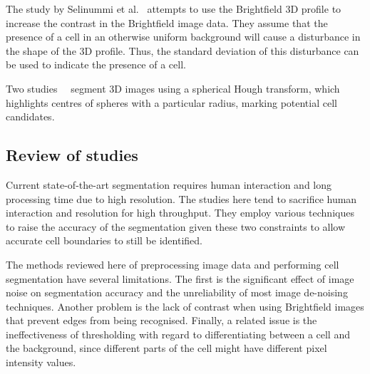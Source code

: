 The study by Selinummi et al.~\cite{selinummi} attempts to use the Brightfield 3D profile to increase the contrast in the Brightfield image data. They assume that the presence of a cell in an otherwise uniform background will cause a disturbance in the shape of the 3D profile. Thus, the standard deviation of this disturbance can be used to indicate the presence of a cell.

Two studies~\cite{liu}~\cite{zanella} segment 3D images using a spherical Hough transform, which highlights centres of spheres with a particular radius, marking potential cell candidates.

\subsection{Review of studies}

Current state-of-the-art segmentation requires human interaction and long processing time due to high resolution. The studies here tend to sacrifice human interaction and resolution for high throughput. They employ various techniques to raise the accuracy of the segmentation given these two constraints to allow accurate cell boundaries to still be identified.

The methods reviewed here of preprocessing image data and performing cell segmentation have several limitations. The first is the significant effect of image noise on segmentation accuracy and the unreliability of most image de-noising techniques. Another problem is the lack of contrast when using Brightfield images that prevent edges from being recognised. Finally, a related issue is the ineffectiveness of thresholding with regard to differentiating between a cell and the background, since different parts of the cell might have different pixel intensity values.
